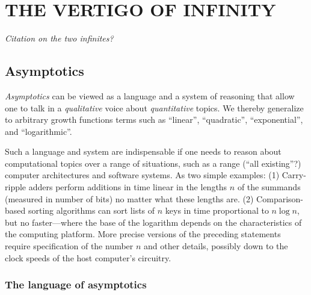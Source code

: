 
\chapter{THE VERTIGO OF INFINITY}
\label{ch:doingmath}

\begin{center}
{\it Citation on the two infinites?} \\
\end{center}


\section{Asymptotics}
\label{sec:asymptotics}

{\em Asymptotics} can be viewed as a language and a system of
reasoning that allow one to talk in a {\em qualitative} voice about
{\em quantitative} topics.  We thereby generalize to arbitrary growth
functions terms such as ``linear'', ``quadratic'', ``exponential'',
and ``logarithmic''.

Such a language and system are indispensable if one needs to reason
about computational topics over a range of situations, such as a range
(``all existing''?)  computer architectures and software systems.  As
two simple examples: (1) Carry-ripple adders perform additions in time
linear in the lengths $n$ of the summands (measured in number of bits)
no matter what these lengths are. (2) Comparison-based sorting
algorithms can sort lists of $n$ keys in time proportional to $n \log
n$, but no faster---where the base of the logarithm depends on the
characteristics of the computing platform.  More precise versions of
the preceding statements require specification of the number $n$ and
other details, possibly down to the clock speeds of the host
computer's circuitry.

\subsection{The language of asymptotics}

